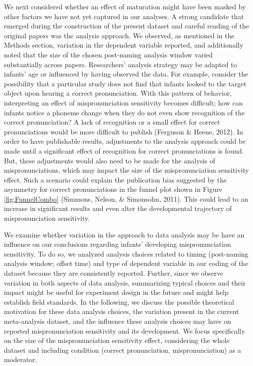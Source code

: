 \documentclass[
  man, noextraspace]{apa6}
\begin{document}
We next considered whether an effect of maturation might have been masked by other factors we have not yet captured in our analyses. A strong candidate that emerged during the construction of the present dataset and careful reading of the original papers was the analysis approach. We observed, as mentioned in the Methods section, variation in the dependent variable reported, and additionally noted that the size of the chosen post-naming analysis window varied substantially across papers. Researchers' analysis strategy may be adapted to infants' age or influenced by having observed the data. For example, consider the possibility that a particular study does not find that infants looked to the target object upon hearing a correct pronunciation. With this pattern of behavior, interpreting an effect of mispronunciation sensitivity becomes difficult; how can infants notice a phoneme change when they do not even show recognition of the correct pronunciation? A lack of recognition or a small effect for correct pronunciations would be more difficult to publish (Ferguson \& Heene, 2012). In order to have publishable results, adjustments to the analysis approach could be made until a significant effect of recognition for correct pronunciations is found. But, these adjustments would also need to be made for the analysis of mispronunciations, which may impact the size of the mispronunciation sensitivity effect. Such a scenario could explain the publication bias suggested by the asymmetry for correct pronunciations in the funnel plot shown in Figure \ref{fig:FunnelCombo} (Simmons, Nelson, \& Simonsohn, 2011). This could lead to an increase in significant results and even alter the developmental trajectory of mispronunciation sensitivity.

We examine whether variation in the approach to data analysis may be have an influence on our conclusions regarding infants' developing mispronunciation sensitivity. To do so, we analyzed analysis choices related to timing (post-naming analysis window; offset time) and type of dependent variable in our coding of the dataset because they are consistently reported. Further, since we observe variation in both aspects of data analysis, summarizing typical choices and their impact might be useful for experiment design in the future and might help establish field standards. In the following, we discuss the possible theoretical motivation for these data analysis choices, the variation present in the current meta-analysis dataset, and the influence these analysis choices may have on reported mispronunciation sensitivity and its development. We focus specifically on the size of the mispronunciation sensitivity effect, considering the whole dataset and including condition (correct pronunciation, mispronunciation) as a moderator.
\end{document}
